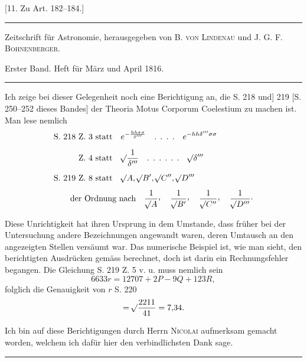 \begin{center}
[11. Zu Art. 182--184.]
\end{center}
\begin{center}
\small
\rule{\textwidth}{.35pt}\par
Zeitschrift für Astronomie, herausgegeben von B. \textsc{von Lindenau} und J. G. F. \textsc{Bohnenberger}.\par
Erster Band. Heft für März und April 1816.\par
\rule{\textwidth}{.35pt}
\end{center}
Ich zeige bei dieser Gelegenheit noch eine Berichtigung an, die S. 218 und] 219 [S. 250--252 dieses Bandes] der Theoria Motus Corporum Coelestium zu machen ist. Man lese nemlich
\[
\begin{aligned}
&\text{S. 218 Z. 3 statt}\quad e^{-\frac{hh\sigma\sigma}{\delta'''}}\quad\text{. . . .}\quad e^{-hh\delta'''\sigma\sigma}\\[5pt]
&\phantom{\text{S. 218 }}\text{Z. 4 statt}\quad\BareRoot{\frac{1}{\delta'''}}\quad\text{. . . . . .}\quad\BareRoot{\delta'''}\\[5pt]
&\text{S. 219 Z. 8 statt}\quad\BareRoot{A},\BareRoot{B'},\BareRoot{C''},\BareRoot{D'''}\\[4pt]
&\qquad\text{der Ordnung nach}\quad
\frac{1}{\BareRoot{A}}\mathpunct{\raisebox{.45ex}{,}}\quad
\frac{1}{\BareRoot{B'}}\mathpunct{\raisebox{.45ex}{,}}\quad
\frac{1}{\BareRoot{C''}}\mathpunct{\raisebox{.45ex}{,}}\quad
\frac{1}{\BareRoot{D'''}}\mathpunct{\cdot}
\end{aligned}
\]

Diese Unrichtigkeit hat ihren Ursprung in dem Umstande, dass früher bei der Untersuchung andere Bezeichnungen angewandt waren, deren Umtausch an den angezeigten Stellen versäumt war. Das numerische Beispiel ist, wie man sieht, den berichtigten Ausdrücken gemäss berechnet, doch ist darin ein Rechnungsfehler begangen. Die Gleichung S. 219 Z. 5 v. u. muss nemlich sein
\[
6633r=12707+2P-9Q+123R,
\]
folglich die Genauigkeit von \(r\) S. 220
\[
=\mathord{{}^{}\!\surd}\frac{2211}{41}=7{,}34.
\]

Ich bin auf diese Berichtigungen durch Herrn \textsc{Nicolai} aufmerksam gemacht worden, welchem ich dafür hier den verbindlichsten Dank sage.
\begin{center}\rule{.18\textwidth}{.35pt}\end{center}
